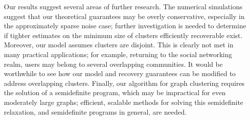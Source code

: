 \documentclass[twoside,11pt]{article}
\newcommand{\0}{\bs{0}}
\begin{document}
{Our results suggest several areas of further research.
The numerical simulations suggest that our theoretical guarantees may be overly conservative, especially in the approximately
sparse noise case;
further investigation is needed to determine if tighter estimates on the minimum size of clusters efficiently recoverable
exist.
Moreover, our model assumes clusters are disjoint. This is clearly not met in many practical applications; for example,
returning to the social networking realm,
users may belong to several overlapping communities.
It would be worthwhile to see how our model and recovery guarantees can be modified to address overlapping clusters.
Finally, our algorithm for graph clustering requires the solution of a semidefinite program, which may be impractical for
even moderately large graphs; efficient, scalable methods for solving this semidefinite relaxation, and semidefinite programs in general, are needed.

%
\newpage
\appendix

}
\end{document}
